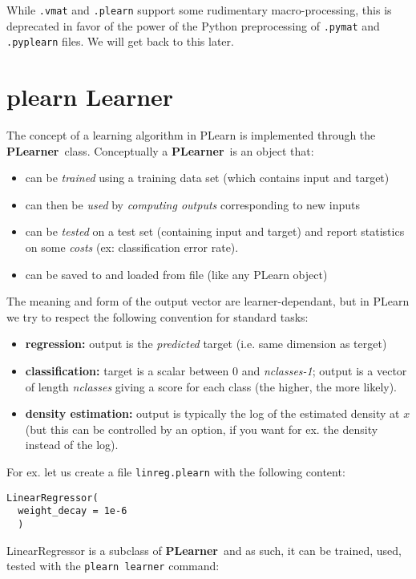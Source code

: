\documentclass[11pt]{book}
\newcommand{\PLearner}{{\bf PLearner}~}
\begin{document}
While {\tt .vmat} and {\tt .plearn} support some rudimentary
macro-processing, this is deprecated in favor of the power of the Python
preprocessing of {\tt .pymat} and {\tt .pyplearn} files. We will get back
to this later.

\section{plearn Learner}

The concept of a learning algorithm in PLearn is implemented through the \PLearner class.
Conceptually a \PLearner is an object that:
\begin{itemize}
\item can be {\em trained} using a training data set (which contains input and target)
\item can then be {\em used} by {\em computing outputs} corresponding to new inputs
\item can be {\em tested} on a test set (containing input and target) and
  report statistics on some {\em costs} (ex: classification error rate).
\item can be saved to and loaded from file (like any PLearn object)
\end{itemize}

The meaning and form of the output vector are learner-dependant, but in PLearn we try to respect 
the following convention for standard tasks:
\begin{itemize}
\item {\bf regression:} output is the {\em predicted} target (i.e. same dimension as terget)
\item {\bf classification:} target is a scalar between $0$ and {\em
    nclasses-1}; output is a vector of length {\em nclasses} giving a score for each class (the higher, the more likely).
\item {\bf density estimation:} output is typically the log of the estimated density at $x$ (but this can be controlled by an option, if you want for ex. the density instead of the log).
\end{itemize}

For ex. let us create a file \verb!linreg.plearn! with the following content:
\begin{verbatim}
LinearRegressor(
  weight_decay = 1e-6
  )
\end{verbatim}

LinearRegressor is a subclass of \PLearner and as such, it can be trained,
used, tested with the \verb!plearn learner! command:
\end{document}
